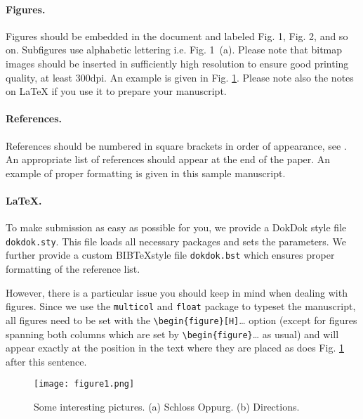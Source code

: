 \documentclass[a4paper, 11pt]{article}
\begin{document}
\begin{multicols}{2}
\paragraph{Figures.}
Figures should be embedded in the document and labeled Fig. 1, Fig. 2, and so on.
Subfigures use alphabetic lettering i.e. Fig. 1~(a). Please note that bitmap images should be inserted in sufficiently high resolution to ensure good printing quality, at least 300dpi. An example is given in Fig. \ref{fig:figure1}. 
Please note also the notes on \LaTeX{} if you use it to prepare your manuscript.

\paragraph{References.}
References should be numbered in square brackets in order of appearance, see \cite{Saleh1991}.
An appropriate list of references should appear at the end of the paper.
An example of proper formatting is given in this sample manuscript.

\paragraph{\LaTeX.}
To make submission as easy as possible for you, we provide a DokDok style file \verb|dokdok.sty|. 
This file loads all necessary packages and sets the parameters.
We further provide a custom BIB\TeX style file \verb|dokdok.bst| which ensures proper formatting of the reference list.

However, there is a particular issue you should keep in mind when dealing with figures.
Since we use the \verb|multicol| and \verb|float| package to typeset the manuscript, all figures need to be set with the \verb|\begin{figure}[H]|\dots{} option (except for figures spanning both columns which are set by \verb|\begin{figure*}|\dots{} as usual) and will appear exactly at the position in the text where they are placed as does Fig. \ref{fig:figure1} after this sentence.

\begin{figure}[H]
\texttt{[image: figure1.png]}
\caption{Some interesting pictures. (a) Schloss Oppurg. (b) Directions.}
\label{fig:figure1}
\end{figure}



\end{multicols}
\end{document}
